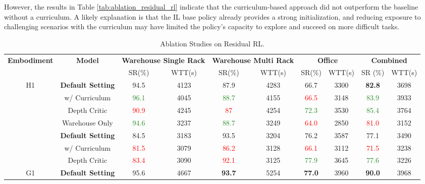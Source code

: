 \documentclass[letterpaper, 10 pt,conference]{ieeeconf}
\begin{document}
However, the results in Table \ref{tab:ablation_residual_rl} indicate that the curriculum-based approach did not outperform the baseline without a curriculum. A likely explanation is that the IL base policy already provides a strong initialization, and reducing exposure to challenging scenarios with the curriculum may have limited the policy’s capacity to explore and succeed on more difficult tasks.

\begin{table*}[ht]
    \centering
    \small
    \caption{Ablation Studies on Residual RL.}
    \begin{tabular}{c|c|cc|cc|cc|cc}
        \toprule
        \textbf{Embodiment} & \textbf{Model} & \multicolumn{2}{c|}{\textbf{Warehouse Single Rack}} & \multicolumn{2}{c|}{\textbf{Warehouse Multi Rack}} & \multicolumn{2}{c|}{\textbf{Office}} & \multicolumn{2}{c}{\textbf{Combined }} \\
        & & SR(\%) & WTT(s) & SR(\%) & WTT(s) & SR(\%) & WTT(s) & SR (\%) & WTT(s) \\
        \midrule
        \multirow{5}{*}{H1} 
        & \textbf{Default Setting} & 94.5 & 4123 & 87.9 & 4283 & 66.7 & 3300 & \textbf{82.8} & 3698 \\
        & w/ Curriculum & \textcolor{ForestGreen}{96.1} & 4045 & \textcolor{ForestGreen}{88.7} & 4155 & \textcolor{red}{66.5} & 3148 & \textcolor{ForestGreen}{83.9} & 3933 \\
        & Depth Critic & \textcolor{red}{90.9} & 4245 & \textcolor{red}{87} & 4254 & \textcolor{ForestGreen}{72.3} & 3530 & \textcolor{ForestGreen}{85.4} & 3764 \\
        & Warehouse Only & \textcolor{ForestGreen}{94.6} & 3237 & \textcolor{ForestGreen}{88.7} & 3249 & \textcolor{red}{64.0} & 2850 & \textcolor{red}{81.0} & 3152 \\
        \midrule
        \multirow{4}{*}{Spot} 
        & \textbf{Default Setting} & 84.5 & 3183 & 93.5 & 3204 & 76.2 & 3587 & 77.1 & 3490 \\
        & w/ Curriculum & \textcolor{red}{81.5} & 3079 & \textcolor{red}{86.2} & 3128 & \textcolor{red}{66.1} & 3112 & \textcolor{red}{71.5} & 3238 \\
        & Depth Critic &\textcolor{red}{83.4} & 3090 & \textcolor{red}{92.1} & 3125 & \textcolor{ForestGreen}{77.9} & 3645 & \textcolor{ForestGreen}{77.6} & 3226 \\
        \midrule
        \multirow{4}{*}{G1} 
        & \textbf{Default Setting} & 95.6 & 4667 & \textbf{93.7} & 5254 & \textbf{77.0} & 3960 & \textbf{90.0} & 3968  \\

\end{tabular}
\end{table*}
\end{document}
